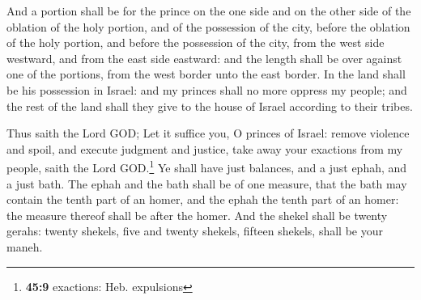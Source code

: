  And a portion shall be for the prince on the one side and
on the other side of the oblation of the holy portion, and of the
possession of the city, before the oblation of the holy portion, and
before the possession of the city, from the west side westward, and from
the east side eastward: and the length shall be over against one of the
portions, from the west border unto the east border.  In
the land shall be his possession in Israel: and my princes shall no more
oppress my people; and the rest of the land shall they give to the house
of Israel according to their tribes.

 Thus saith the Lord GOD; Let it suffice you, O princes of
Israel: remove violence and spoil, and execute judgment and justice,
take away your exactions from my people, saith the Lord GOD.\footnote{\textbf{45:9}
  exactions: Heb. expulsions}  Ye shall have just
balances, and a just ephah, and a just bath.  The ephah
and the bath shall be of one measure, that the bath may contain the
tenth part of an homer, and the ephah the tenth part of an homer: the
measure thereof shall be after the homer.  And the shekel
shall be twenty gerahs: twenty shekels, five and twenty shekels, fifteen
shekels, shall be your maneh.

